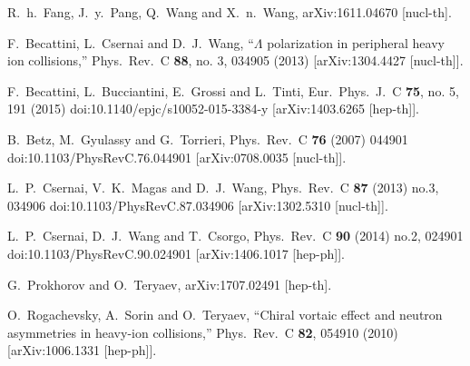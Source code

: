 \documentclass[preprint,aps,showpacs,nofootinbib,superscriptaddress,preprintnumbers,epsf,psf]{revtex4}
\begin{document}
\begin{thebibliography}{99}
  R.~h.~Fang, J.~y.~Pang, Q.~Wang and X.~n.~Wang,
  arXiv:1611.04670 [nucl-th].




  F.~Becattini, L.~Csernai and D.~J.~Wang,
  ``$\Lambda$ polarization in peripheral heavy ion collisions,''
  Phys.\ Rev.\ C {\bf 88}, no. 3, 034905 (2013)
  [arXiv:1304.4427 [nucl-th]].


  F.~Becattini, L.~Bucciantini, E.~Grossi and L.~Tinti,
  Eur.\ Phys.\ J.\ C {\bf 75}, no. 5, 191 (2015)
  doi:10.1140/epjc/s10052-015-3384-y
  [arXiv:1403.6265 [hep-th]].


  B.~Betz, M.~Gyulassy and G.~Torrieri,
  Phys.\ Rev.\ C {\bf 76} (2007) 044901
  doi:10.1103/PhysRevC.76.044901
  [arXiv:0708.0035 [nucl-th]].

  L.~P.~Csernai, V.~K.~Magas and D.~J.~Wang,
  Phys.\ Rev.\ C {\bf 87} (2013) no.3,  034906
  doi:10.1103/PhysRevC.87.034906
  [arXiv:1302.5310 [nucl-th]].


  L.~P.~Csernai, D.~J.~Wang and T.~Csorgo,
  Phys.\ Rev.\ C {\bf 90} (2014) no.2,  024901
  doi:10.1103/PhysRevC.90.024901
  [arXiv:1406.1017 [hep-ph]].

  G.~Prokhorov and O.~Teryaev,
  arXiv:1707.02491 [hep-th].

  O.~Rogachevsky, A.~Sorin and O.~Teryaev,
  ``Chiral vortaic effect and neutron asymmetries in heavy-ion collisions,''
  Phys.\ Rev.\ C {\bf 82}, 054910 (2010)  [arXiv:1006.1331 [hep-ph]].  %




\end{thebibliography}
\end{document}
